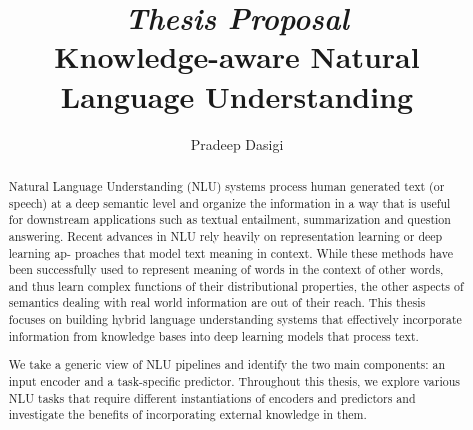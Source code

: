 \documentclass[12pt]{cmuthesis}
\begin{document}
 
\frontmatter

\pagestyle{empty}

\title{ {\it \huge Thesis Proposal}\\
{\bf Knowledge-aware Natural Language Understanding}}
\author{Pradeep Dasigi}
\date{}
\trnumber{}


\support{}
\disclaimer{}



\maketitle

% 

\pagestyle{plain} %


\begin{abstract}
Natural Language Understanding (NLU) systems
process human generated text (or speech) at a deep semantic level and organize
the information in a way that is useful for downstream applications such as
textual entailment, summarization and question answering. Recent
advances in NLU rely heavily on representation learning or deep learning ap-
proaches that model text meaning in context. While these methods have been
successfully used to represent meaning of words in the context of other words,
and thus learn complex functions of their distributional properties, the other
aspects of semantics dealing with real world information are out of their reach.
This thesis focuses on building hybrid language understanding systems that effectively
incorporate information from knowledge bases into deep learning models that process text.

We take a generic view of NLU pipelines and identify the two main components: an input encoder and
a task-specific predictor. Throughout this thesis, we explore various NLU tasks that require
different instantiations of encoders and predictors and investigate the benefits of incorporating
external knowledge in them.

\end{abstract}
\end{document}
